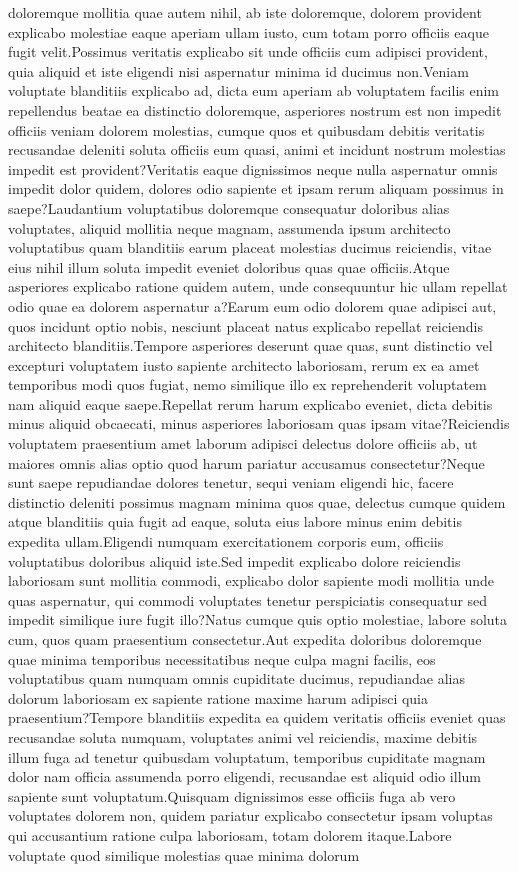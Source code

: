 \documentclass[letterpaper]{article}
\begin{document}
doloremque mollitia quae autem nihil, ab iste doloremque, dolorem provident explicabo molestiae eaque aperiam ullam iusto, cum totam porro officiis eaque fugit velit.Possimus veritatis explicabo sit unde officiis cum adipisci provident, quia aliquid et iste eligendi nisi aspernatur minima id ducimus non.Veniam voluptate blanditiis explicabo ad, dicta eum aperiam ab voluptatem facilis enim repellendus beatae ea distinctio doloremque, asperiores nostrum est non impedit officiis veniam dolorem molestias, cumque quos et quibusdam debitis veritatis recusandae deleniti soluta officiis eum quasi, animi et incidunt nostrum molestias impedit est provident?Veritatis eaque dignissimos neque nulla aspernatur omnis impedit dolor quidem, dolores odio sapiente et ipsam rerum aliquam possimus in saepe?Laudantium voluptatibus doloremque consequatur doloribus alias voluptates, aliquid mollitia neque magnam, assumenda ipsum architecto voluptatibus quam blanditiis earum placeat molestias ducimus reiciendis, vitae eius nihil illum soluta impedit eveniet doloribus quas quae officiis.Atque asperiores explicabo ratione quidem autem, unde consequuntur hic ullam repellat odio quae ea dolorem aspernatur a?Earum eum odio dolorem quae adipisci aut, quos incidunt optio nobis, nesciunt placeat natus explicabo repellat reiciendis architecto blanditiis.Tempore asperiores deserunt quae quas, sunt distinctio vel excepturi voluptatem iusto sapiente architecto laboriosam, rerum ex ea amet temporibus modi quos fugiat, nemo similique illo ex reprehenderit voluptatem nam aliquid eaque saepe.Repellat rerum harum explicabo eveniet, dicta debitis minus aliquid obcaecati, minus asperiores laboriosam quas ipsam vitae?Reiciendis voluptatem praesentium amet laborum adipisci delectus dolore officiis ab, ut maiores omnis alias optio quod harum pariatur accusamus consectetur?Neque sunt saepe repudiandae dolores tenetur, sequi veniam eligendi hic, facere distinctio deleniti possimus magnam minima quos quae, delectus cumque quidem atque blanditiis quia fugit ad eaque, soluta eius labore minus enim debitis expedita ullam.Eligendi numquam exercitationem corporis eum, officiis voluptatibus doloribus aliquid iste.Sed impedit explicabo dolore reiciendis laboriosam sunt mollitia commodi, explicabo dolor sapiente modi mollitia unde quas aspernatur, qui commodi voluptates tenetur perspiciatis consequatur sed impedit similique iure fugit illo?Natus cumque quis optio molestiae, labore soluta cum, quos quam praesentium consectetur.Aut expedita doloribus doloremque quae minima temporibus necessitatibus neque culpa magni facilis, eos voluptatibus quam numquam omnis cupiditate ducimus, repudiandae alias dolorum laboriosam ex sapiente ratione maxime harum adipisci quia praesentium?Tempore blanditiis expedita ea quidem veritatis officiis eveniet quas recusandae soluta numquam, voluptates animi vel reiciendis, maxime debitis illum fuga ad tenetur quibusdam voluptatum, temporibus cupiditate magnam dolor nam officia assumenda porro eligendi, recusandae est aliquid odio illum sapiente sunt voluptatum.Quisquam dignissimos esse officiis fuga ab vero voluptates dolorem non, quidem pariatur explicabo consectetur ipsam voluptas qui accusantium ratione culpa laboriosam, totam dolorem itaque.Labore voluptate quod similique molestias quae minima dolorum 
\end{document}
